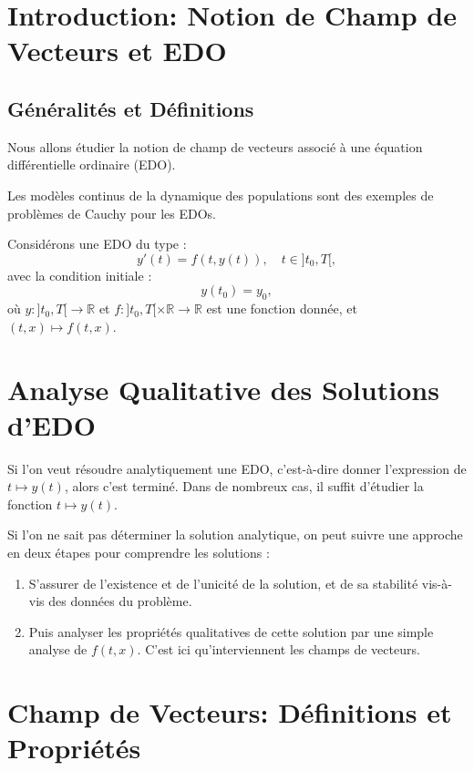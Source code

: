 \documentclass[oneside]{book}
\begin{document}
\section{Introduction: Notion de Champ de Vecteurs et EDO}

\subsection{Généralités et Définitions}

Nous allons étudier la notion de champ de vecteurs associé à une équation différentielle ordinaire (EDO).

Les modèles continus de la dynamique des populations sont des exemples de problèmes de Cauchy pour les EDOs.

Considérons une EDO du type :
\begin{equation}
\label{eq:edo_generale}
y'(t) = f(t, y(t)), \quad t \in ]t_0, T[,
\end{equation}
avec la condition initiale :
\begin{equation}
\label{eq:condition_initiale}
y(t_0) = y_0,
\end{equation}
où $y : ]t_0, T[ \rightarrow \mathbb{R}$ et $f : ]t_0, T[ \times \mathbb{R} \rightarrow \mathbb{R}$ est une fonction donnée, et $(t, x) \mapsto f(t, x)$.

\section{Analyse Qualitative des Solutions d'EDO}

Si l'on veut résoudre analytiquement une EDO, c'est-à-dire donner l'expression de $t \mapsto y(t)$, alors c'est terminé. Dans de nombreux cas, il suffit d'étudier la fonction $t \mapsto y(t)$.

Si l'on ne sait pas déterminer la solution analytique, on peut suivre une approche en deux étapes pour comprendre les solutions :

\begin{enumerate}
    \item S'assurer de l'existence et de l'unicité de la solution, et de sa stabilité vis-à-vis des données du problème.
    \item Puis analyser les propriétés qualitatives de cette solution par une simple analyse de $f(t, x)$. C'est ici qu'interviennent les champs de vecteurs.
\end{enumerate}

\section{Champ de Vecteurs: Définitions et Propriétés}
\end{document}
